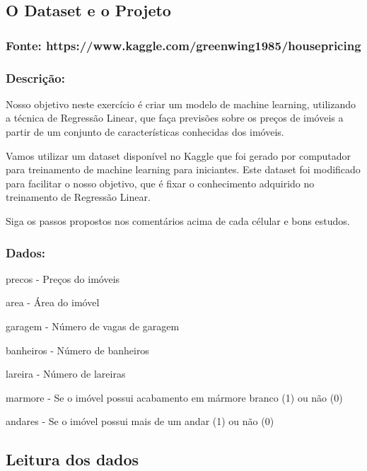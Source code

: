 \documentclass[11pt]{article}
\begin{document}
    \hypertarget{o-dataset-e-o-projeto}{%
\subsection{O Dataset e o Projeto}\label{o-dataset-e-o-projeto}}

\hypertarget{fonte-httpswww.kaggle.comgreenwing1985housepricing}{%
\subsubsection{Fonte:
https://www.kaggle.com/greenwing1985/housepricing}\label{fonte-httpswww.kaggle.comgreenwing1985housepricing}}

\hypertarget{descriuxe7uxe3o}{%
\subsubsection{Descrição:}\label{descriuxe7uxe3o}}

Nosso objetivo neste exercício é criar um modelo de machine learning,
utilizando a técnica de Regressão Linear, que faça previsões sobre os
preços de imóveis a partir de um conjunto de características conhecidas
dos imóveis.

Vamos utilizar um dataset disponível no Kaggle que foi gerado por
computador para treinamento de machine learning para iniciantes. Este
dataset foi modificado para facilitar o nosso objetivo, que é fixar o
conhecimento adquirido no treinamento de Regressão Linear.

Siga os passos propostos nos comentários acima de cada célular e bons
estudos.

\hypertarget{dados}{%
\subsubsection{Dados:}\label{dados}}

precos - Preços do imóveis

area - Área do imóvel

garagem - Número de vagas de garagem

banheiros - Número de banheiros

lareira - Número de lareiras

marmore - Se o imóvel possui acabamento em mármore branco (1) ou não (0)

andares - Se o imóvel possui mais de um andar (1) ou não (0)

    \hypertarget{leitura-dos-dados}{%
\subsection{Leitura dos dados}\label{leitura-dos-dados}}
\end{document}
